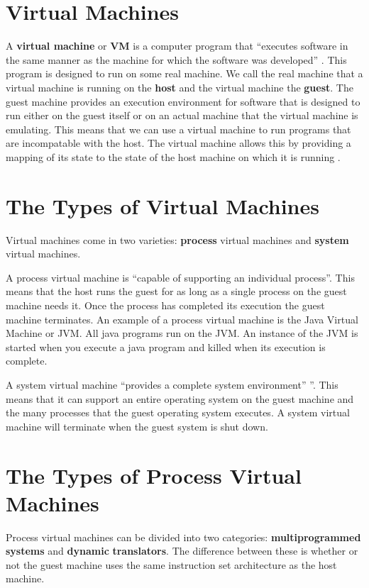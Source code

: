 \documentclass[english,a4paper]{report}
\begin{document}
\section{Virtual Machines}
A \textbf{virtual machine} or \textbf{VM} is a computer program that
``executes software in the same manner as the machine for which the
software was developed'' \cite[pg9]{JamesE.Smith2005}. This program is
designed to run on some real machine. We call the real machine that a
virtual machine is running on the \textbf{host} and the virtual
machine the \textbf{guest}. The guest machine provides an execution
environment for software that is designed to run either on the guest
itself or on an actual machine that the virtual machine is
emulating. This means that we can use a virtual machine to run
programs that are incompatable with the host. The virtual machine
allows this by providing a mapping of its state to the state of the
host machine on which it is running \cite[pg4]{JamesE.Smith2005}.

\section{The Types of Virtual Machines}
Virtual machines come in two varieties: \textbf{process} virtual
machines and \textbf{system} virtual machines.

A process virtual machine is ``capable of supporting an individual
process''\cite[pg9]{JamesE.Smith2005}. This means that the host runs
the guest for as long as a single process on the guest machine needs
it. Once the process has completed its execution the guest machine
terminates\cite[pg9]{JamesE.Smith2005}. An example of a process
virtual machine is the Java Virtual Machine or JVM. All java programs
run on the JVM. An instance of the JVM is started when you execute a
java program and killed when its execution is complete.

A system virtual machine ``provides a complete system environment''
''\cite[pg9]{JamesE.Smith2005}. This means that it can support an
entire operating system on the guest machine and the many processes
that the guest operating system executes. A system virtual machine
will terminate when the guest system is shut down.

\section{The Types of Process Virtual Machines}

Process virtual machines can be divided into two categories:
\textbf{multiprogrammed systems} and \textbf{dynamic}
\textbf{translators}. The difference between these is whether or not the
guest machine uses the same instruction set architecture as the host
machine.
\end{document}
